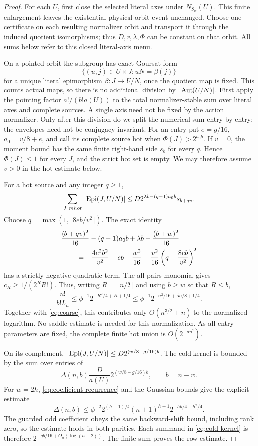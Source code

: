 \begin{proof}
For each $U$, first close the selected literal axes under
$N_{S_w}(U)$. This finite enlargement leaves the existential physical
orbit event unchanged. Choose one certificate on each resulting
normalizer orbit and transport it through the induced quotient
isomorphisms; thus $D,v,\lambda,\Phi$ can be constant on that orbit.
All sums below refer to this closed literal-axis menu.

On a pointed orbit the subgroup has exact Goursat form
\[
 \{(u,j)\in U\times J:uN=\beta(j)\}
\]
for a unique literal epimorphism $\beta:J\to U/N$, once the quotient
map is fixed. This counts actual maps, so there is no additional
division by $|\operatorname{Aut}(U/N)|$. First apply the pointing factor
$n!/(b!a(U))$ to the total normalizer-stable sum over literal axes and
complete sources. A single axis need not be fixed by the action
normalizer. Only after this division do we split the numerical sum
entry by entry; the envelopes need not be conjugacy invariant.
For an entry put
$e=g/16$, $a_0=v/8+e$, and call its complete source hot when
$\Phi(J)>2^{a_0b}$.
If $v=0$, the moment bound has the same finite right-hand side $s_b$
for every $q$. Hence $\Phi(J)\leq1$ for every $J$, and the strict hot
set is empty. We may therefore assume $v>0$ in the hot estimate below.

For a hot source and any integer $q\geq1$,
\[
 \sum_{J\ {
m hot}}|\operatorname{Epi}(J,U/N)|
 \leq D2^{\lambda b-(q-1)a_0b}s_{b+qv}.
\]
Choose $q=\max(1,\lceil8eb/v^2\rceil)$. The exact identity
\begin{align}\label{eq:hot-square}
 &\frac{(b+qv)^2}{16}-(q-1)a_0b+\lambda b
              -\frac{(b+w)^2}{16}\notag\\
 &\hspace{8mm}=-\frac{4e^2b^2}{v^2}-eb-\frac{w^2}{16}
       +\frac{v^2}{16}\left(q-\frac{8eb}{v^2}\right)^2
\end{align}
has a strictly negative quadratic term. The all-pairs monomial gives
$c_R\geq1/(2^RR!)$. Thus, writing $R=\lfloor n/2\rfloor$ and
using $b\geq w$ so that $R\leq b$,
\[
 \frac{n!}{b!L_n}
 \leq\phi^{-1}2^{-R^2/4+R+1/4}
 \leq\phi^{-1}2^{-n^2/16+5n/8+1/4}.
\]
Together with \eqref{eq:coarse}, this contributes only
$O(n^{3/2}+n)$ to the normalized logarithm. No saddle estimate is
needed for this normalization.
As all entry parameters are fixed, the complete finite hot union is
$O(2^{-a n^2})$.

On its complement,
$|\operatorname{Epi}(J,U/N)|\leq D2^{(w/8-g/16)b}$. The cold kernel is bounded by
the sum over entries of
\begin{equation}\label{eq:cold-kernel}
 \Delta(n,b)\frac{D}{a(U)}2^{(w/8-g/16)b},\qquad b=n-w.
\end{equation}
For $w=2h$, \eqref{eq:coefficient-recurrence} and the Gaussian
bounds give the explicit estimate
\[
 \Delta(n,b)\leq
 \phi^{-2}2^{(h+1)/4}(n+1)^{h+1}2^{-hb/4-h^2/4}.
\]
The guarded odd coefficient obeys the same backward-shift bound,
including rank zero, so the estimate holds in both parities. Each summand
in \eqref{eq:cold-kernel} is therefore
$2^{-gb/16+O_w(\log(n+2))}$. The finite sum proves the row estimate.


\end{proof}
